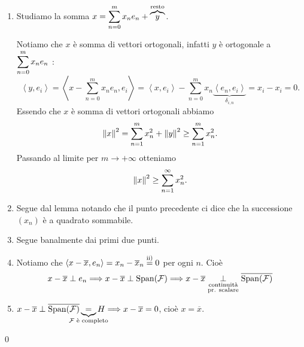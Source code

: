\begin{enumerate}
\item Studiamo la somma $\displaystyle x = \sum_{n=0}^{m} x_n e_n + \overbrace{y}^{\text{resto}}$.

Notiamo che $x$ è somma di vettori ortogonali, infatti $y$ è ortogonale a $\displaystyle \sum_{n=0}^{m} x_n e_n$ :
%
$$
	\left<y,e_i \right> = \left<x - \sum_{n=0}^{m} x_n e_n, e_i \right>
	= \left<x,e_i \right> - \sum_{n=0}^{m} x_n \underbrace{\left<e_n,e_i \right>}_{\delta_{i,n}} = x_i - x_i = 0.
$$
%
Essendo che $x$ è somma di vettori ortogonali abbiamo
%
$$
	\left\lVert x \right\rVert^2 = \sum_{n=1}^{m} x_n^2 + \left\lVert y \right\rVert^2 \geq \sum_{n=1}^{m} x_n^2.
$$
%
Passando al limite per $m \to +\infty$ otteniamo
%
$$
	\left\lVert x \right\rVert^2 \geq \sum_{n=1}^{\infty} x_n^2. 
$$
%

\item Segue dal lemma notando che il punto precedente ci dice che la successione $(x_n)$ è a quadrato sommabile.

\item Segue banalmente dai primi due punti.

\item Notiamo che $\left<x - \overline{x}, e_n \right> = x_n - \overline{x}_n \overset{\text{ii)}}{=} 0$ per ogni $n$. Cioè
%
$$
	x - \overline{x} \perp e_n \Longrightarrow x - \overline{x} \perp \operatorname{Span}(\mathcal{F})
	\Longrightarrow x - \overline{x} \underset{\substack{\text{continuità} \\ \text{pr. scalare}}}{\perp} \overline{\operatorname{Span}(\mathcal{F})}
$$
%

\item $x - \overline{x} \perp \overline{\spn(\mc{F})} \underbrace{=}_{\mathclap{\text{$\mc{F}$ è completo}}} H \Longrightarrow x - \overline{x} = 0$, cioè $x = \overline{x}$.
\end{enumerate}
\qed


